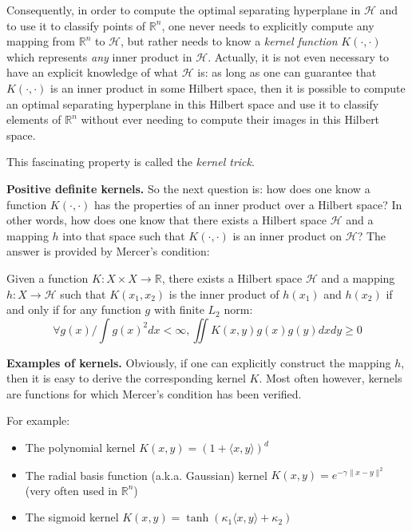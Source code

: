 \documentclass{article}
\begin{document}
Consequently, in order to compute the optimal separating hyperplane in $\mathcal{H}$ and to use it to classify points of $\mathbb{R}^n$, one never needs to explicitly compute any mapping from $\mathbb{R}^n$ to $\mathcal{H}$, but rather needs to know a \emph{kernel function} $K(\cdot,\cdot)$ which represents \emph{any} inner product in $\mathcal{H}$. Actually, it is not even necessary to have an explicit knowledge of what $\mathcal{H}$ is: as long as one can guarantee that $K(\cdot,\cdot)$ is an inner product in some Hilbert space, then it is possible to compute an optimal separating hyperplane in this Hilbert space and use it to classify elements of $\mathbb{R}^n$ without ever needing to compute their images in this Hilbert space.

This fascinating property is called the \emph{kernel trick}.

\textbf{Positive definite kernels.} So the next question is: how does one know a function $K(\cdot,\cdot)$ has the properties of an inner product over a Hilbert space? In other words, how does one know that there exists a Hilbert space $\mathcal{H}$ and a mapping $h$ into that space such that $K(\cdot,\cdot)$ is an inner product on $\mathcal{H}$? The answer is provided by Mercer's condition:

Given a function $K:X\times X \rightarrow \mathbb{R}$, there exists a Hilbert space $\mathcal{H}$ and a mapping $h:X\rightarrow\mathcal{H}$ such that $K(x_1,x_2)$ is the inner product of $h(x_1)$ and $h(x_2)$ if and only if for any function $g$ with finite $L_2$ norm:
\begin{equation*}
\forall g(x) / \int g(x)^2dx <\infty, \iint K(x,y)g(x)g(y)dxdy \geq 0
\end{equation*}

\textbf{Examples of kernels.} Obviously, if one can explicitly construct the mapping $h$, then it is easy to derive the corresponding kernel $K$. Most often however, kernels are functions for which Mercer's condition has been verified.

For example:
\begin{itemize}
\item The polynomial kernel $K(x,y)=\left(1+\langle x, y\rangle\right)^d$
\item The radial basis function (a.k.a. Gaussian) kernel $K(x,y) = e^{-\gamma \|x-y\|^2}$ (very often used in $\mathbb{R}^n$)
\item The sigmoid kernel $K(x,y) = \tanh\left(\kappa_1 \langle x, y\rangle + \kappa_2\right)$
\end{itemize}
\end{document}
